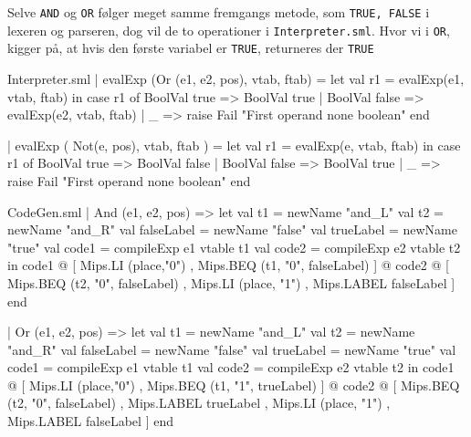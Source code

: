 \documentclass[11pt,a4paper,oneside]{report}
\begin{document}
Selve \texttt{AND} og \texttt{OR} følger meget samme fremgangs metode, som \texttt{TRUE, FALSE} i lexeren og parseren, dog vil de to operationer i \texttt{Interpreter.sml}. Hvor vi i \texttt{OR}, kigger på, at hvis den første variabel er \texttt{TRUE}, returneres der \texttt{TRUE}

\begin{code}[firstnumber=190]{Interpreter.sml}
| evalExp (Or (e1, e2, pos), vtab, ftab) =
        let
          val r1 = evalExp(e1, vtab, ftab)
        in
          case r1 of
               BoolVal true => BoolVal true
             | BoolVal false  => evalExp(e2, vtab, ftab)
             | _ => raise Fail "First operand none boolean"
        end

  | evalExp ( Not(e, pos), vtab, ftab ) =
        let
          val r1 = evalExp(e, vtab, ftab)
        in
          case r1 of
               BoolVal true => BoolVal false
             | BoolVal false  => BoolVal true
             | _ => raise Fail "First operand none boolean"
        end
\end{code}

\begin{code}[firstnumber=408]{CodeGen.sml}
  | And (e1, e2, pos) =>
    let val t1 = newName "and_L"
        val t2 = newName "and_R"
        val falseLabel = newName "false"
        val trueLabel = newName "true"
        val code1 = compileExp e1 vtable t1
        val code2 = compileExp e2 vtable t2
    in
      code1 @
      [ Mips.LI (place,"0")
      , Mips.BEQ (t1, "0", falseLabel) ]
      @ code2 @
      [ Mips.BEQ (t2, "0", falseLabel)
      , Mips.LI (place, "1")
      , Mips.LABEL falseLabel ]
    end

  | Or (e1, e2, pos) =>
    let val t1 = newName "and_L"
        val t2 = newName "and_R"
        val falseLabel = newName "false"
        val trueLabel = newName "true"
        val code1 = compileExp e1 vtable t1
        val code2 = compileExp e2 vtable t2
    in
            code1 @
            [ Mips.LI (place,"0")
            , Mips.BEQ (t1, "1", trueLabel) ]
            @ code2 @
            [ Mips.BEQ (t2, "0", falseLabel)
            , Mips.LABEL trueLabel
            , Mips.LI (place, "1")
            , Mips.LABEL falseLabel ]    end
\end{code}




\end{document}
